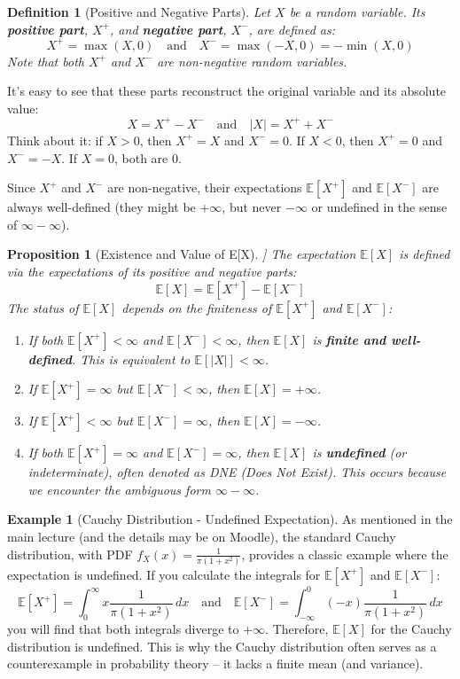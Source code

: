 \documentclass[11pt]{article}
\newtheorem{definition}[theorem]{Definition}
\newtheorem{proposition}[theorem]{Proposition}
\theoremstyle{definition}
\newtheorem{example}[theorem]{Example}
\theoremstyle{remark}
\newcommand{\E}{\mathbb{E}}
\begin{document}
\begin{definition}[Positive and Negative Parts]
Let $X$ be a random variable. Its \textbf{positive part}, $X^+$, and \textbf{negative part}, $X^-$, are defined as:
\[ X^+ = \max(X, 0) \quad \text{and} \quad X^- = \max(-X, 0) = -\min(X, 0) \]
Note that both $X^+$ and $X^-$ are \emph{non-negative} random variables.
\end{definition}

It's easy to see that these parts reconstruct the original variable and its absolute value:
\[ X = X^+ - X^- \quad \text{and} \quad |X| = X^+ + X^- \]
Think about it: if $X > 0$, then $X^+ = X$ and $X^- = 0$. If $X < 0$, then $X^+ = 0$ and $X^- = -X$. If $X=0$, both are $0$.

Since $X^+$ and $X^-$ are non-negative, their expectations $\E[X^+]$ and $\E[X^-]$ are always well-defined (they might be $+\infty$, but never $-\infty$ or undefined in the sense of $\infty - \infty$).

\begin{proposition}[Existence and Value of E[X]]
The expectation $\E[X]$ is defined via the expectations of its positive and negative parts:
\[ \E[X] = \E[X^+] - \E[X^-] \]
The status of $\E[X]$ depends on the finiteness of $\E[X^+]$ and $\E[X^-]$:
\begin{enumerate}
    \item If both $\E[X^+] < \infty$ and $\E[X^-] < \infty$, then $\E[X]$ is \textbf{finite and well-defined}. This is equivalent to $\E[|X|] < \infty$.
    \item If $\E[X^+] = \infty$ but $\E[X^-] < \infty$, then $\E[X] = +\infty$.
    \item If $\E[X^+] < \infty$ but $\E[X^-] = \infty$, then $\E[X] = -\infty$.
    \item If both $\E[X^+] = \infty$ and $\E[X^-] = \infty$, then $\E[X]$ is \textbf{undefined} (or indeterminate), often denoted as DNE (Does Not Exist). This occurs because we encounter the ambiguous form $\infty - \infty$.
\end{enumerate}
\end{proposition}

\begin{example}[Cauchy Distribution - Undefined Expectation]
As mentioned in the main lecture (and the details may be on Moodle), the standard Cauchy distribution, with PDF $f_X(x) = \frac{1}{\pi(1+x^2)}$, provides a classic example where the expectation is undefined. If you calculate the integrals for $\E[X^+]$ and $\E[X^-]$:
\[ \E[X^+] = \int_0^\infty x \frac{1}{\pi(1+x^2)} \, dx \quad \text{and} \quad \E[X^-] = \int_{-\infty}^0 (-x) \frac{1}{\pi(1+x^2)} \, dx \]
you will find that both integrals diverge to $+\infty$. Therefore, $\E[X]$ for the Cauchy distribution is undefined. This is why the Cauchy distribution often serves as a counterexample in probability theory – it lacks a finite mean (and variance).
\end{example}
\end{document}
